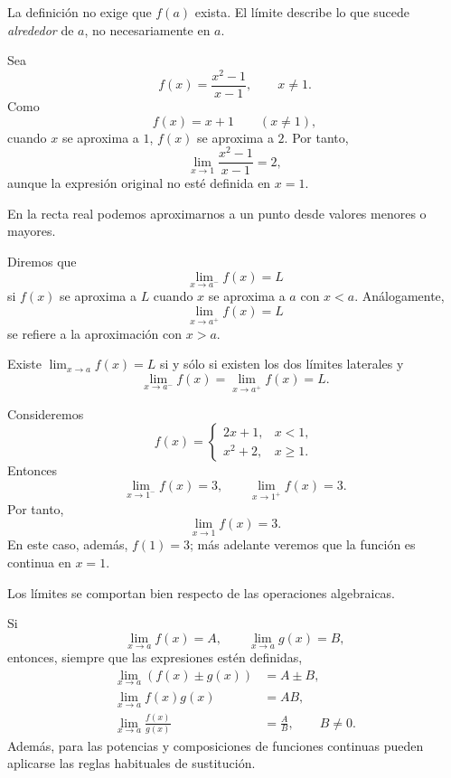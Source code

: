 La definición no exige que $f(a)$ exista. El límite describe lo que sucede \emph{alrededor} de $a$, no necesariamente en $a$.

\begin{example}
Sea
\[
f(x)=\frac{x^2-1}{x-1},\qquad x\neq1.
\]
Como
\[
f(x)=x+1\qquad (x\neq1),
\]
cuando $x$ se aproxima a $1$, $f(x)$ se aproxima a $2$. Por tanto,
\[
\lim_{x\to1}\frac{x^2-1}{x-1}=2,
\]
aunque la expresión original no esté definida en $x=1$.
\end{example}

En la recta real podemos aproximarnos a un punto desde valores menores o mayores.

\begin{definition}
Diremos que
\[
\lim_{x\to a^-}f(x)=L
\]
si $f(x)$ se aproxima a $L$ cuando $x$ se aproxima a $a$ con $x<a$. Análogamente,
\[
\lim_{x\to a^+}f(x)=L
\]
se refiere a la aproximación con $x>a$.
\end{definition}

\begin{theorem}
Existe $\displaystyle\lim_{x\to a}f(x)=L$ si y sólo si existen los dos límites laterales y
\[
\lim_{x\to a^-}f(x)=\lim_{x\to a^+}f(x)=L.
\]
\end{theorem}

\begin{example}
Consideremos
\[
f(x)=
\begin{cases}
2x+1, & x<1,\\
x^2+2, & x\geq1.
\end{cases}
\]
Entonces
\[
\lim_{x\to1^-}f(x)=3,
\qquad
\lim_{x\to1^+}f(x)=3.
\]
Por tanto,
\[
\lim_{x\to1}f(x)=3.
\]
En este caso, además, $f(1)=3$; más adelante veremos que la función es continua en $x=1$.
\end{example}

Los límites se comportan bien respecto de las operaciones algebraicas.

\begin{proposition}
Si
\[
\lim_{x\to a}f(x)=A,
\qquad
\lim_{x\to a}g(x)=B,
\]
entonces, siempre que las expresiones estén definidas,
\begin{align*}
\lim_{x\to a}(f(x)\pm g(x))&=A\pm B,\\
\lim_{x\to a}f(x)g(x)&=AB,\\
\lim_{x\to a}\frac{f(x)}{g(x)}&=\frac AB,\qquad B\neq0.
\end{align*}
Además, para las potencias y composiciones de funciones continuas pueden aplicarse las reglas habituales de sustitución.
\end{proposition}


